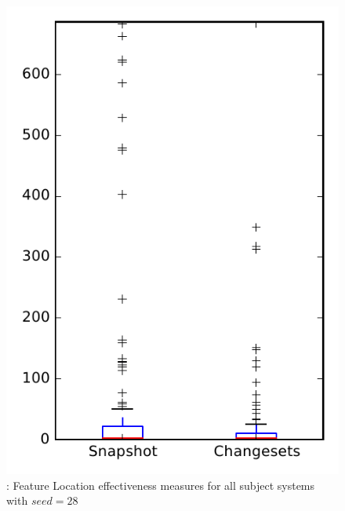 
\begin{figure}
\centering
\includegraphics[height=0.4\textheight]{figures/flt_seed/rq1_overview_28}
\caption{\rone: Feature Location effectiveness measures for all subject systems with $seed=28$}
\label{fig:flt_seed:rq1:overview}
\end{figure}
